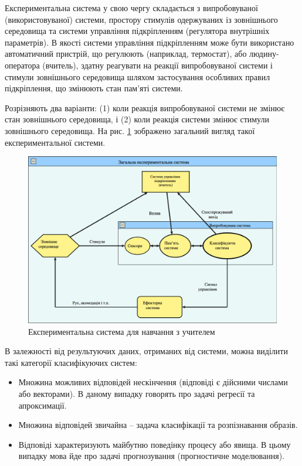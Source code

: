 Експериментальна система у свою чергу складається з випробовуваної (використовуваної) системи, простору стимулів одержуваних із зовнішнього середовища та системи управління підкріпленням (регулятора внутрішніх параметрів). В якості системи управління підкріпленням може бути використано автоматичний пристрій, що регулюють (наприклад, термостат), або людину-оператора (вчитель), здатну реагувати на реакції випробовуваної системи і стимули зовнішнього середовища шляхом застосування особливих правил підкріплення, що змінюють стан пам'яті системи.

Розрізняють два варіанти: (1) коли реакція випробовуваної системи не змінює стан зовнішнього середовища, і (2) коли реакція системи змінює стимули зовнішнього середовища. На рис. \ref{fig:experiment_system} зображено загальний вигляд такої експериментальної системи.
\begin{figure}[h!]
  \includegraphics[width=\linewidth]{figures/fig_system.png}
  \caption{Експериментальна система для навчання з учителем}
  \label{fig:experiment_system}
\end{figure}

В залежності від результуючих даних, отриманих від системи, можна виділити такі категорії класифікуючих систем:
\begin{itemize}  
	\item Множина можливих відповідей нескінчення (відповіді є дійсними числами або векторами). В даному випадку говорять про задачі регресії та апроксимації.
	\item Множина відповідей звичайна – задача класифікації та розпізнавання образів.
	\item Відповіді характеризують майбутню поведінку процесу або явища. В цьому випадку мова йде про задачі прогнозування (прогностичне моделювання).
\end{itemize}


